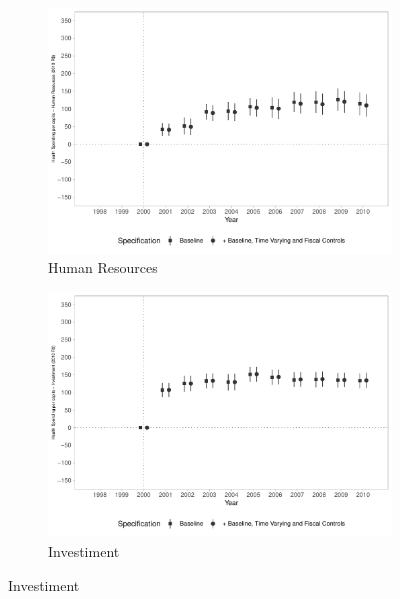 \begin{figure}[h!]
    \begin{center}
    \caption{Effects on Public Health Spending per capita - By Type}\label{fig:10}
    \begin{subfigure}{0.48\textwidth}
        \centering
        \caption{\scriptsize Human Resources}\label{fig:10a}
        \includegraphics[width=\textwidth]{plots/siops_desppessoal_pcapita_dist_ec29_baseline_dist_ec29_baseline_10.pdf}
    \end{subfigure}
    \begin{subfigure}{0.48\textwidth}
        \centering
        \caption{\scriptsize Investiment}\label{fig:10b}
        \includegraphics[width=\textwidth]{plots/siops_despinvest_pcapita_dist_ec29_baseline_dist_ec29_baseline_10.pdf}
    \end{subfigure}

\end{center}
\end{figure}
